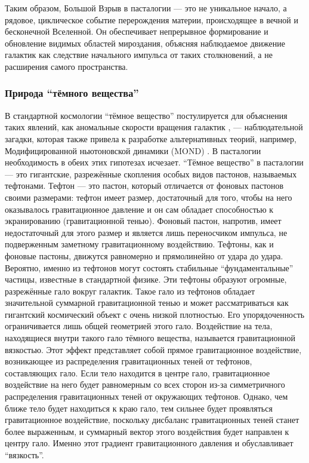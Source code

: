 \documentclass[pdflatex,sn-mathphys-num]{sn-jnl}
\begin{document}
Таким образом, Большой Взрыв в пасталогии --- это не уникальное начало, а рядовое, циклическое событие перерождения материи, происходящее в вечной и бесконечной Вселенной. Он обеспечивает непрерывное формирование и обновление видимых областей мироздания, объясняя наблюдаемое движение галактик как следствие начального импульса от таких столкновений, а не расширения самого пространства.

\subsubsection{Природа ``тёмного вещества''}\label{subsubsec:dark-matter}

В стандартной космологии ``тёмное вещество'' постулируется для объяснения таких явлений, как аномальные скорости вращения галактик \cite{rubin1980}, --- наблюдательной загадки, которая также привела к разработке альтернативных теорий, например, Модифицированной ньютоновской динамики (MOND) \cite{milgrom1983-mond}. В пасталогии необходимость в обеих этих гипотезах исчезает.
``Тёмное вещество'' в пасталогии --- это гигантские, разрежённые скопления особых видов пастонов, называемых тефтонами. Тефтон --- это пастон, который отличается от фоновых пастонов своими размерами: тефтон имеет размер, достаточный для того, чтобы на него оказывалось гравитационное давление и он сам обладает способностью к экранированию (гравитационной тенью). Фоновый пастон, напротив, имеет недостаточный для этого размер и является лишь переносчиком импульса, не подверженным заметному гравитационному воздействию. Тефтоны, как и фоновые пастоны, движутся равномерно и прямолинейно от удара до удара. Вероятно, именно из тефтонов могут состоять стабильные ``фундаментальные'' частицы, известные в стандартной физике.
Эти тефтоны образуют огромные, разрежённые гало вокруг галактик. Такое гало из тефтонов обладает значительной суммарной гравитационной тенью и может рассматриваться как гигантский космический объект с очень низкой плотностью. Его упорядоченность ограничивается лишь общей геометрией этого гало.
Воздействие на тела, находящиеся внутри такого гало тёмного вещества, называется гравитационной вязкостью. Этот эффект представляет собой прямое гравитационное воздействие, возникающее из распределения гравитационных теней от тефтонов, составляющих гало. Если тело находится в центре гало, гравитационное воздействие на него будет равномерным со всех сторон из-за симметричного распределения гравитационных теней от окружающих тефтонов. Однако, чем ближе тело будет находиться к краю гало, тем сильнее будет проявляться гравитационное воздействие, поскольку дисбаланс гравитационных теней станет более выраженным, и суммарный вектор этого воздействия будет направлен к центру гало. Именно этот градиент гравитационного давления и обуславливает ``вязкость''.
\end{document}
